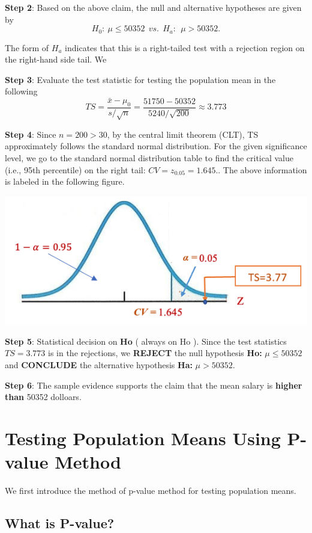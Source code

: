 \documentclass[
]{book}
\begin{document}
\textbf{Step 2}: Based on the above claim, the null and alternative hypotheses are given by
\[H_0:  \ \mu \le 50352    \  \ vs.  \  \ H_a: \  \ \mu > 50352.\]

The form of \(H_a\) indicates that this is a right-tailed test with a rejection region on the right-hand side tail. We

\textbf{Step 3}: Evaluate the test statistic for testing the population mean in the following
\[TS = \frac{\bar{x} - \mu_0}{s/\sqrt{n}} = \frac{51750 - 50352}{5240/\sqrt{200}} \approx 3.773\]

\textbf{Step 4}: Since \(n = 200 > 30\), by the central limit theorem (CLT), TS approximately follows the standard normal distribution. For the given significance level, we go to the standard normal distribution table to find the critical value (i.e., 95th percentile) on the right tail: \(CV = z_{0.05} = 1.645.\). The above information is labeled in the following figure.

\begin{center}\includegraphics[width=0.5\linewidth]{week09/example01} \end{center}

\textbf{Step 5}: Statistical decision on \textbf{Ho} ( always on Ho ).
Since the test statistics \(TS = 3.773\) is in the rejections, we \textbf{REJECT} the null hypothesis \textbf{Ho: } \(\mu \le 50352\) and \textbf{CONCLUDE} the alternative hypothesis \textbf{Ha: } \(\mu > 50352\).

\textbf{Step 6}: The sample evidence supports the claim that the mean salary is \textbf{higher than} 50352 dolloars.

\hfill\break

\hypertarget{testing-population-means-using-p-value-method}{%
\section{Testing Population Means Using P-value Method}\label{testing-population-means-using-p-value-method}}

We first introduce the method of p-value method for testing population means.

\hypertarget{what-is-p-value}{%
\subsection{What is P-value?}\label{what-is-p-value}}
\end{document}
